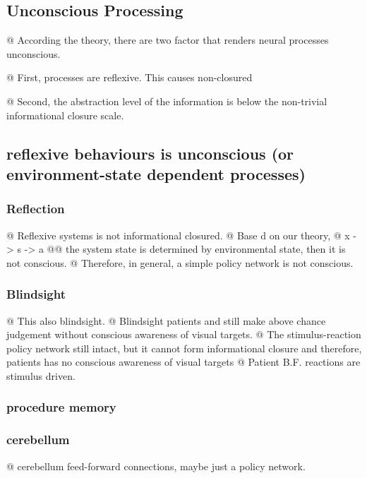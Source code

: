 \documentclass[utf8]{article}
\begin{document}
\begin{backup}
		\subsection{Unconscious Processing}
		\begin{ants}
			@ According the theory, there are two factor that renders neural processes unconscious.

			@ First, processes are reflexive. This causes non-closured

			@ Second, the abstraction level of the information is below the non-trivial informational closure scale.
		\end{ants}



		\subsection{reflexive behaviours is unconscious (or environment-state dependent processes)}\label{sec:reflexive}
		\subsubsection{Reflection}
		\begin{ants}
			@ Reflexive systems is not informational closured.
			@ Base	d on our theory,
			@ x -> s -> a
			@@ the system state is determined by environmental state, then it is not conscious.
			@ Therefore, in general, a simple policy network is not conscious.
		\end{ants}

		\subsubsection{Blindsight}
		\begin{ants}
			@ This also blindsight.
			@ Blindsight patients and still make above chance judgement without conscious awareness of visual targets.
			@ The stimulus-reaction policy network still intact, but it cannot form informational closure and therefore, patients has no conscious awareness of visual  targets
			@ Patient B.F. reactions are stimulus driven.
		\end{ants}

		\subsubsection{procedure memory}

		\subsubsection{cerebellum}
		\begin{ants}
			@ cerebellum feed-forward connections, maybe just a policy network.
		\end{ants}


\end{backup}
\end{document}
